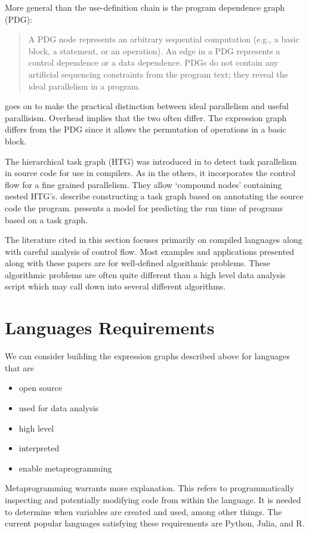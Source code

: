 \documentclass[12pt]{article}
\begin{document}
More general than the use-definition chain is the program dependence graph (PDG)\cite{ferrante1987}:
\begin{quote}
    A PDG node represents
    an arbitrary sequential computation (e.g., a basic block, a
    statement, or an operation). An edge in a PDG represents
    a control dependence or a data dependence. PDGs do not
    contain any artificial sequencing constraints from the
    program text; they reveal the ideal parallelism in a
    program. \cite{sarkar1991automatic} 
\end{quote}
\cite{sarkar1991automatic} goes on to make the practical distinction between ideal
parallelism and useful parallisism. Overhead implies that the two often
differ.
The expression graph differs from the PDG since it allows the permutation of
operations in a basic block.

The hierarchical task graph (HTG) was introduced in \cite{girkar1992automatic}
to detect task parallelism in source code for use in compilers.
As in the others, it incorporates the control flow for a fine grained
parallelism. They allow `compound nodes' containing nested HTG's.
\cite{cosnard1995automatic} describe constructing a task graph based on
annotating the source code the program.
\cite{adve2004parallel} presents a model for predicting the run time of
programs based on a task graph. 

The literature cited in this section focuses primarily on compiled
languages along with careful analysis of control flow. Most examples and
applications presented along with these papers are for well-defined
algorithmic problems. These algorithmic problems are often quite different
than a high level data analysis script which may call down into several
different algorithms.

\section{Languages Requirements}

We can consider building the expression graphs described above for languages that are
\begin{itemize}
    \item open source
    \item used for data analysis
    \item high level
    \item interpreted
    \item enable metaprogramming
\end{itemize}
Metaprogramming warrants more explanation. This refers to programmatically
inspecting and potentially modifying code from within the language.  It is
needed to determine when variables are created and used, among other
things.  The current popular languages satisfying these requirements are
Python, Julia, and R.
\end{document}
